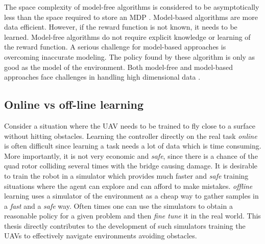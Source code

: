 \documentclass[12pt]{report}
\begin{document}
The space complexity of model-free algorithms is considered to be asymptotically less than the space required to store an MDP \cite{strehl2006pac}. Model-based algorithms are more data efficient. However, if the reward function is not known, it needs to be learned. Model-free algorithms do not require explicit knowledge or learning of the reward function. A serious challenge for model-based approaches is overcoming
inaccurate modeling. The policy found by these algorithm is only as good as the model of the environment. Both model-free and model-based approaches face challenges in handling high dimensional data \cite{atkeson1997comparison}. 

\subsection{Online vs off-line learning}
Consider a situation where the UAV needs to be trained to fly close to a surface without hitting obstacles. Learning the controller directly on the real task \textit{online} is often difficult since learning a task needs a lot of data which is time consuming. More importantly, it is not very economic and \textit{safe}, since there is a chance of the quad rotor colliding several times with the bridge causing damage. It is desirable to train the robot in a simulator which provides much faster and \textit{safe} training situations where the agent can explore and can afford to make mistakes. \textit{offline} learning uses a simulator of the environment as a cheap way to gather samples in a \textit{fast} and a \textit{safe} way. Often times one can use the simulators to obtain a reasonable policy for a given problem and then \textit{fine tune} it in the real world. This thesis directly contributes to the development of such simulators training the UAVs to effectively navigate environments avoiding obstacles.
\end{document}
